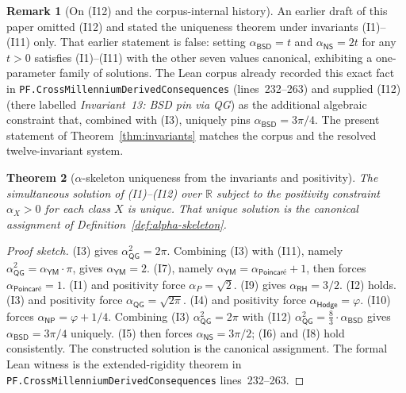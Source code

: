 \documentclass[11pt,a4paper]{amsart}
\theoremstyle{plain}
\newtheorem{theorem}{Theorem}[section]
\theoremstyle{definition}
\newtheorem{remark}[theorem]{Remark}
\begin{document}
\begin{remark}[On (I12) and the corpus-internal history]\label{rem:I12-history}
An earlier draft of this paper omitted (I12) and stated the uniqueness theorem under invariants (I1)--(I11) only. That earlier statement is false: setting $\alpha_{\textsf{BSD}}=t$ and $\alpha_{\textsf{NS}}=2t$ for any $t>0$ satisfies (I1)--(I11) with the other seven values canonical, exhibiting a one-parameter family of solutions. The Lean corpus already recorded this exact fact in \texttt{PF.CrossMillenniumDerivedConsequences} (lines~232--263) and supplied (I12) (there labelled \emph{Invariant~13: BSD pin via QG}) as the additional algebraic constraint that, combined with (I3), uniquely pins $\alpha_{\textsf{BSD}}=3\pi/4$. The present statement of Theorem~\ref{thm:invariants} matches the corpus and the resolved twelve-invariant system.
\end{remark}

\begin{theorem}[$\alpha$-skeleton uniqueness from the invariants and positivity]\label{thm:alpha-skeleton-unique}
The simultaneous solution of (I1)--(I12) over $\mathbb{R}$ subject to the positivity constraint $\alpha_X > 0$ for each class $X$ is unique. That unique solution is the canonical assignment of Definition~\ref{def:alpha-skeleton}.
\end{theorem}

\begin{proof}[Proof sketch]
(I3) gives $\alpha_{\textsf{QG}}^{2} = 2\pi$. Combining (I3) with (I11), namely $\alpha_{\textsf{QG}}^{2} = \alpha_{\textsf{YM}}\cdot\pi$, gives $\alpha_{\textsf{YM}} = 2$. (I7), namely $\alpha_{\textsf{YM}} = \alpha_{\textsf{Poincar\'e}} + 1$, then forces $\alpha_{\textsf{Poincar\'e}} = 1$. (I1) and positivity force $\alpha_{P} = \sqrt{2}$. (I9) gives $\alpha_{\textsf{RH}} = 3/2$. (I2) holds. (I3) and positivity force $\alpha_{\textsf{QG}} = \sqrt{2\pi}$. (I4) and positivity force $\alpha_{\textsf{Hodge}} = \varphi$. (I10) forces $\alpha_{\textsf{NP}} = \varphi + 1/4$. Combining (I3) $\alpha_{\textsf{QG}}^{2} = 2\pi$ with (I12) $\alpha_{\textsf{QG}}^{2} = \tfrac{8}{3}\cdot\alpha_{\textsf{BSD}}$ gives $\alpha_{\textsf{BSD}} = 3\pi/4$ uniquely. (I5) then forces $\alpha_{\textsf{NS}} = 3\pi/2$; (I6) and (I8) hold consistently. The constructed solution is the canonical assignment. The formal Lean witness is the extended-rigidity theorem in \texttt{PF.CrossMillenniumDerivedConsequences} lines~232--263.
\end{proof}
\end{document}
